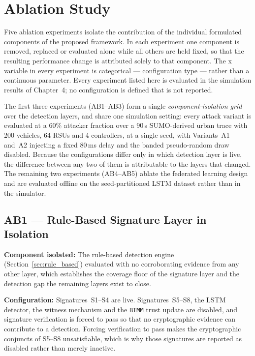 \documentclass[12pt, a4paper]{report}
\begin{document}
{{\section{Ablation Study}
\label{sec:ablation}

Five ablation experiments isolate the contribution of
the individual formulated components of the proposed
framework. In each experiment one component is
removed, replaced or evaluated alone while all others
are held fixed, so that the resulting performance
change is attributed solely to that component. The x
variable in every experiment is categorical ---
configuration type --- rather than a continuous
parameter. Every experiment listed here is evaluated
in the simulation results of Chapter~4; no configuration is
defined that is not reported.

The first three experiments (AB1--AB3) form a single
\emph{component-isolation grid} over the detection
layers, and share one simulation setting: every
attack variant is evaluated at a 60\% attacker
fraction over a 90\,s \ac{SUMO}-derived urban trace
with 200 vehicles, 64 \ac{RSU}s and 4 controllers, at
a single seed, with Variants~A1 and~A2 injecting a
fixed 80\,ms delay and the banded pseudo-random draw
disabled. Because the configurations differ only in
which detection layer is live, the difference between
any two of them is attributable to the layers that
changed. The remaining two experiments (AB4--AB5)
ablate the federated learning design and are
evaluated offline on the seed-partitioned \ac{LSTM}
dataset rather than in the simulator.

\subsection{AB1 --- Rule-Based Signature Layer in
Isolation}
\label{sec:ab1}

\textbf{Component isolated:}
The rule-based detection engine
(Section~\ref{sec:rule_based}) evaluated with no
corroborating evidence from any other layer, which
establishes the coverage floor of the signature
layer and the detection gap the remaining layers
exist to close.

\textbf{Configuration:}
Signatures~S1--S4 are live. Signatures~S5--S8, the
\ac{LSTM} detector, the witness mechanism and the
\texttt{BTMM} trust update are disabled, and
signature verification is forced to pass so that no
cryptographic evidence can contribute to a
detection. Forcing verification to pass makes the
cryptographic conjuncts of S5--S8 unsatisfiable,
which is why those signatures are reported as
disabled rather than merely inactive.

}}
\end{document}
